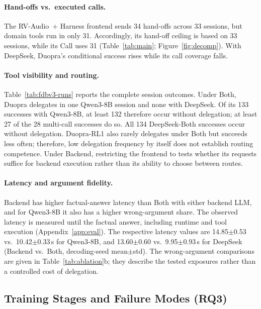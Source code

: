 \paragraph{Hand-offs vs.\ executed calls.}
The RV-Audio~+ Harness frontend sends 34 hand-offs across 33 sessions, but domain tools run in only 31. Accordingly, its hand-off ceiling is based on 33 sessions, while its Call uses 31 (Table~\ref{tab:main}; Figure~\ref{fig:decomp}). With DeepSeek, Duopra's conditional success rises while its call coverage falls.



\paragraph{Tool visibility and routing.}
Table~\ref{tab:fdbv3-runs} reports the complete session outcomes. Under Both, Duopra delegates in one Qwen3-8B session and none with DeepSeek. Of its 133 successes with Qwen3-8B, at least 132 therefore occur without delegation; at least 27 of the 28 multi-call successes do so. All 134 DeepSeek-Both successes occur without delegation. Duopra-RL1 also rarely delegates under Both but succeeds less often; therefore, low delegation frequency by itself does not establish routing competence. Under Backend, restricting the frontend to  tests whether its requests suffice for backend execution rather than its ability to choose between routes.

\paragraph{Latency and argument fidelity.}
\label{app:latency}
Backend has higher factual-answer latency than Both with either backend LLM, and for Qwen3-8B it also has a higher wrong-argument share. The observed latency is measured until the factual answer, including runtime and tool execution (Appendix~\ref{app:eval}). The respective latency values are 14.85$\pm$0.53 vs.\ 10.42$\pm$0.33\,s for Qwen3-8B, and 13.60$\pm$0.60 vs.\ 9.95$\pm$0.93\,s for DeepSeek (Backend vs.\ Both, decoding-seed mean$\pm$std). The wrong-argument comparisons are given in Table~\ref{tab:ablation}b; they describe the tested exposures rather than a controlled cost of delegation.

\subsection{Training Stages and Failure Modes (RQ3)}


